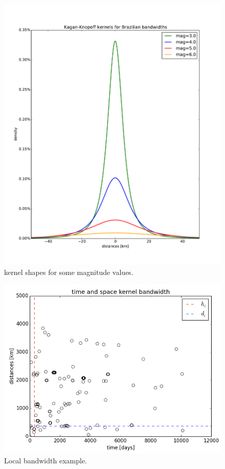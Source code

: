 \documentclass[grl]{agutex}
\begin{document}
\begin{figure}
	\includegraphics[width=0.99\linewidth]{z_img_woo_kernels}
	\caption{\citet{kagan_knopoff_1980} kernel shapes for some magnitude values.}
	\label{fig_woo_kernels}
\end{figure}





\begin{figure}
	\includegraphics[width=0.99\linewidth]{z_img_helmstetter_hidi}
	\caption{Local bandwidth example.}
	\label{fig_helmstetter_hidi}
\end{figure}
\end{document}
